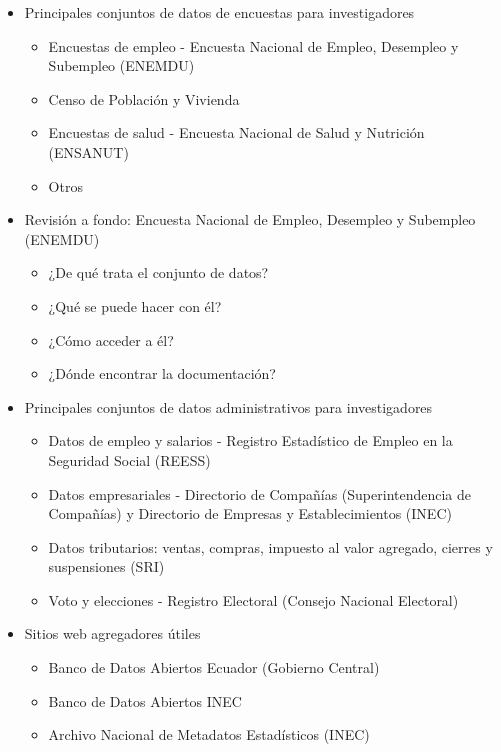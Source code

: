 \documentclass[
  letterpaper,
  DIV=11,
  numbers=noendperiod]{scrartcl}
\providecommand{\tightlist}{%
  \setlength{\itemsep}{0pt}\setlength{\parskip}{0pt}}\usepackage{longtable,booktabs,array}
\begin{document}
\begin{itemize}
\tightlist
\item
  Principales conjuntos de datos de encuestas para investigadores

  \begin{itemize}
  \tightlist
  \item
    Encuestas de empleo - Encuesta Nacional de Empleo, Desempleo y
    Subempleo (ENEMDU)
  \item
    Censo de Población y Vivienda
  \item
    Encuestas de salud - Encuesta Nacional de Salud y Nutrición
    (ENSANUT)
  \item
    Otros
  \end{itemize}
\item
  Revisión a fondo: Encuesta Nacional de Empleo, Desempleo y Subempleo
  (ENEMDU)

  \begin{itemize}
  \tightlist
  \item
    ¿De qué trata el conjunto de datos?
  \item
    ¿Qué se puede hacer con él?
  \item
    ¿Cómo acceder a él?
  \item
    ¿Dónde encontrar la documentación?
  \end{itemize}
\item
  Principales conjuntos de datos administrativos para investigadores

  \begin{itemize}
  \tightlist
  \item
    Datos de empleo y salarios - Registro Estadístico de Empleo en la
    Seguridad Social (REESS)
  \item
    Datos empresariales - Directorio de Compañías (Superintendencia de
    Compañías) y Directorio de Empresas y Establecimientos (INEC)
  \item
    Datos tributarios: ventas, compras, impuesto al valor agregado,
    cierres y suspensiones (SRI)
  \item
    Voto y elecciones - Registro Electoral (Consejo Nacional Electoral)
  \end{itemize}
\item
  Sitios web agregadores útiles

  \begin{itemize}
  \tightlist
  \item
    Banco de Datos Abiertos Ecuador (Gobierno Central)
  \item
    Banco de Datos Abiertos INEC
  \item
    Archivo Nacional de Metadatos Estadísticos (INEC)
  \end{itemize}
\end{itemize}
\end{document}
